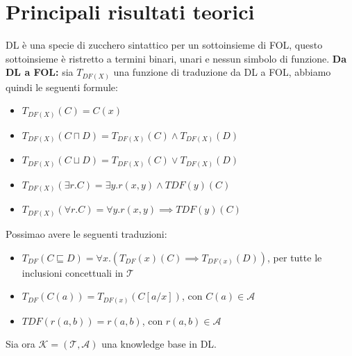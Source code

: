 \documentclass[../main.tex]{subfiles}
\newcommand{\spazio}{\vspace{2em} \newline}
\begin{document}
   \section{Principali risultati teorici}
   DL è una specie di zucchero sintattico per un sottoinsieme di FOL, questo sottoinsieme è ristretto a termini binari, unari e nessun simbolo di funzione.
   \spazio
   \textbf{Da DL a FOL:} sia $T_{DF(X)}$ una funzione di traduzione da DL a FOL, abbiamo quindi le seguenti formule:
   \begin{itemize}
      \item $T_{DF(X)}(C) = C(x)$
      \item $T_{DF(X)}(C \sqcap D) = T_{DF(X)}(C) \land T_{DF(X)}(D)$
      \item $T_{DF(X)}(C \sqcup D) = T_{DF(X)}(C) \lor T_{DF(X)}(D)$
      \item $T_{DF(X)}(\exists r.C) = \exists y.r(x, y) \land TDF(y)(C)$
      \item $T_{DF(X)}(\forall r.C) = \forall y.r(x, y) \implies TDF(y)(C)$
   \end{itemize}
   Possimao avere le seguenti traduzioni:
   \begin{itemize}
      \item $T_{DF} (C \sqsubseteq D) = \forall x.(T_{DF}(x)(C) \implies T_{DF(x)}(D))$, per tutte le inclusioni concettuali in $\mathcal{T}$
      \item $T_{DF} (C(a)) = T_{DF(x)}(C[a/x])$, con $C(a) \in \mathcal{A}$
      \item $TDF (r(a, b)) = r(a, b)$, con $r(a,b) \in \mathcal{A}$
   \end{itemize}
   Sia ora $\mathcal{K}= (\mathcal{T},\mathcal{A})$ una knowledge base in DL.   
\end{document}
